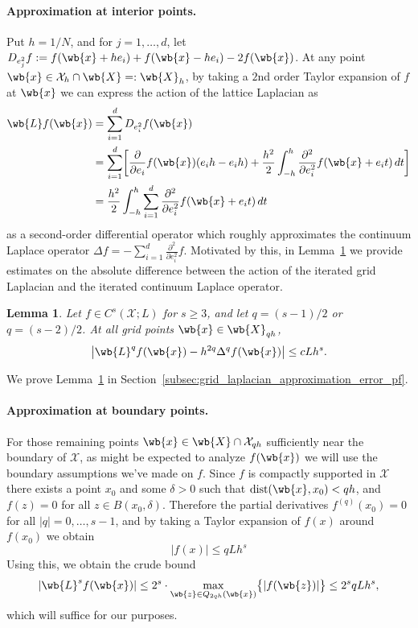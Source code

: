 \documentclass{article}
\newcommand{\abs}[1]{\left \lvert #1 \right \rvert}
\newcommand{\1}{\mathbf{1}}
\newcommand{\Xset}{\mathcal{X}}
\theoremstyle{alden}
\theoremstyle{aldenthm}
\newtheorem{lemma}{Lemma}
\theoremstyle{definition}
\theoremstyle{remark}
\begin{document}
\paragraph{Approximation at interior points.}
Put $h = 1/N$, and for $j = 1,\ldots,d$, let $D_{e_j^2}f := f(\wb{x} + he_i) + f(\wb{x} - he_i) - 2f(\wb{x})$. At any point $\wb{x} \in \Xset_{h} \cap \wb{X} =: \wb{X}_{h}$, by taking a $2$nd order Taylor expansion of $f$ at $\wb{x}$ we can express the action of the lattice Laplacian as
\begin{align}
\wb{L}f(\wb{x}) & = \sum_{i = 1}^{d} D_{e_i^2}f(\wb{x}) \nonumber \\
& = \sum_{i = 1}^{d} \biggl[\frac{\partial}{\partial e_i} f(\wb{x})(e_ih - e_ih) + \frac{h^2}{2} \int_{-h}^{h} \frac{\partial^2}{\partial e_i^2} f(\wb{x} + e_it) \,dt \biggr] \nonumber \\
& = \frac{h^2}{2} \int_{-h}^{h} \sum_{i = 1}^{d} \frac{\partial^2}{\partial e_i^2} f(\wb{x} + e_it) \,dt \label{eqn:grid_sobolev_norm_higher_order_pf1}
\end{align} 
as a second-order differential operator which roughly approximates the continuum Laplace operator $\Delta f = -\sum_{i = 1}^{d} \frac{\partial^2}{\partial e_i^2} f$. Motivated by this, in Lemma~\ref{lem:grid_laplacian_approximation_error} we provide estimates on the absolute difference between the action of the iterated grid Laplacian and the iterated continuum Laplace operator.

\begin{lemma}
	\label{lem:grid_laplacian_approximation_error}
	Let $f \in C^s(\Xset;L)$ for $s \geq 3$, and let $q = (s - 1)/2$ or $q = (s - 2)/2$. At all grid points $\wb{x} \in \wb{X}_{qh}$,
	\begin{equation*}
	\abs{\wb{L}^{q}f(\wb{x}) - h^{2q}\Delta^{q}f(\wb{x})} \leq cLh^s.
	\end{equation*}
\end{lemma} 
We prove Lemma~\ref{lem:grid_laplacian_approximation_error} in Section~\ref{subsec:grid_laplacian_approximation_error_pf}.

\paragraph{Approximation at boundary points.}
For those remaining points $\wb{x} \in \wb{X} \cap \Xset_{qh}$ sufficiently near the boundary of $\Xset$, as might be expected to analyze $f(\wb{x})$ we will use the boundary assumptions we've made on $f$. Since $f$ is compactly supported in $\Xset$ there exists a point $x_0$ and some $\delta > 0$ such that $\mathrm{dist}(\wb{x},x_0) < qh$, and $f(z) = 0$ for all $z \in B(x_0,\delta)$. Therefore the partial derivatives $f^{(q)}(x_0) = 0$ for all $\abs{q} = 0,\ldots,s - 1$, and by taking a Taylor expansion of $f(x)$ around $f(x_0)$ we obtain
\begin{equation*}
\abs{f(x)} \leq q L h^{s}
\end{equation*}
Using this, we obtain the crude bound
\begin{equation*}
\abs{\wb{L}^s f(\wb{x})} \leq 2^s \cdot \max_{\wb{z} \in Q_{2qh}(\wb{x})} \bigl\{\abs{f(\wb{z})} \bigr\} \leq 2^s q L h^{s},
\end{equation*}
which will suffice for our purposes. 
\end{document}
